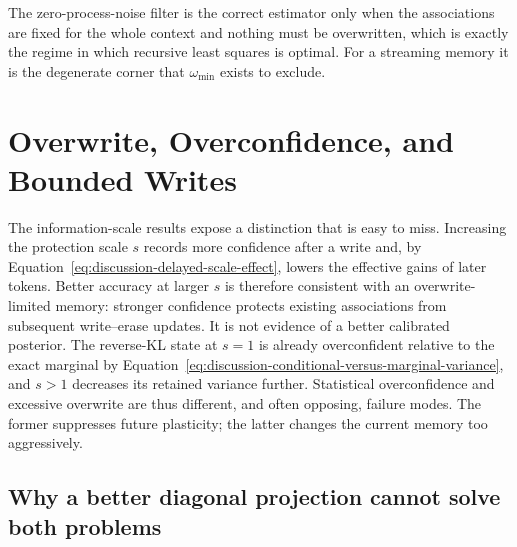 \documentclass[11pt]{article}
\begin{document}
The zero-process-noise filter is the correct estimator only when the associations are fixed for
the whole context and nothing must be overwritten, which is exactly the regime in which recursive
least squares is optimal. For a streaming memory it is the degenerate corner that $\omega_{\min}$
exists to exclude.

\section{Overwrite, Overconfidence, and Bounded Writes}
\label{sec:discussion-bounded-overwrite}

The information-scale results expose a distinction that is easy to miss. Increasing the
protection scale $s$ records more confidence after a write and, by
Equation~\eqref{eq:discussion-delayed-scale-effect}, lowers the effective gains of later tokens.
Better accuracy at larger $s$ is therefore consistent with an overwrite-limited memory: stronger
confidence protects existing associations from subsequent write--erase updates. It is not evidence
of a better calibrated posterior. The reverse-KL state at $s=1$ is already overconfident relative
to the exact marginal by Equation~\eqref{eq:discussion-conditional-versus-marginal-variance}, and
$s>1$ decreases its retained variance further. Statistical overconfidence and excessive overwrite
are thus different, and often opposing, failure modes. The former suppresses future plasticity;
the latter changes the current memory too aggressively.

\subsection{Why a better diagonal projection cannot solve both problems}
\label{subsec:discussion-correlation-aware-approximation}
\end{document}
